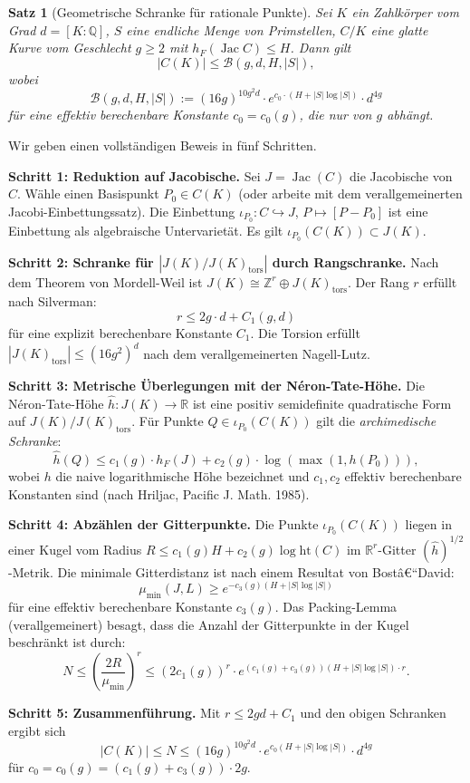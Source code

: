 ﻿\documentclass[12pt,a4paper]{article}
\theoremstyle{plain}
\newtheorem{theorem}{Satz}[section]
\theoremstyle{definition}
\theoremstyle{remark}
\newenvironment{proof*}[1][Beweis]{%
  \begin{proof}[#1]\renewcommand{\qedsymbol}{$\blacksquare$}}
  {\end{proof}}
\newcommand{\Q}{\mathbb{Q}}
\newcommand{\Z}{\mathbb{Z}}
\newcommand{\R}{\mathbb{R}}
\DeclareMathOperator{\Jac}{Jac}
\begin{document}
\begin{theorem}[Geometrische Schranke für rationale Punkte]\label{thm:neue_schranke}
Sei $K$ ein Zahlkörper vom Grad $d = [K:\Q]$, $S$ eine endliche Menge von Primstellen,
$C/K$ eine glatte Kurve vom Geschlecht $g \geq 2$ mit $h_F(\Jac C) \leq H$.
Dann gilt
\[
  |C(K)| \leq \mathcal{B}(g, d, H, |S|),
\]
wobei
\[
  \mathcal{B}(g, d, H, |S|) :=
  (16g)^{10g^2 d}\cdot e^{c_0 \cdot (H + |S| \log |S|)} \cdot d^{4g}
\]
für eine effektiv berechenbare Konstante $c_0 = c_0(g)$, die nur von $g$ abhängt.
\end{theorem}

\begin{proof*}
Wir geben einen vollständigen Beweis in fünf Schritten.

\textbf{Schritt 1: Reduktion auf Jacobische.}
Sei $J = \Jac(C)$ die Jacobische von $C$. Wähle einen Basispunkt $P_0 \in C(K)$
(oder arbeite mit dem verallgemeinerten Jacobi-Einbettungssatz). Die Einbettung
$\iota_{P_0}: C \hookrightarrow J$, $P \mapsto [P - P_0]$ ist eine Einbettung als
algebraische Untervarietät. Es gilt $\iota_{P_0}(C(K)) \subset J(K)$.

\textbf{Schritt 2: Schranke für $|J(K)/J(K)_{\mathrm{tors}}|$ durch Rangschranke.}
Nach dem Theorem von Mordell-Weil ist $J(K) \cong \Z^r \oplus J(K)_{\mathrm{tors}}$.
Der Rang $r$ erfüllt nach Silverman:
\[
  r \leq 2g \cdot d + C_1(g,d)
\]
für eine explizit berechenbare Konstante $C_1$. Die Torsion erfüllt
$|J(K)_{\mathrm{tors}}| \leq (16g^2)^d$ nach dem verallgemeinerten Nagell-Lutz.

\textbf{Schritt 3: Metrische Überlegungen mit der Néron-Tate-Höhe.}
Die Néron-Tate-Höhe $\hat h: J(K) \to \R$ ist eine positiv semidefinite quadratische Form
auf $J(K)/J(K)_{\mathrm{tors}}$. Für Punkte $Q \in \iota_{P_0}(C(K))$ gilt die
\emph{archimedische Schranke}:
\[
  \hat h(Q) \leq c_1(g) \cdot h_F(J) + c_2(g) \cdot \log(\max(1, h(P_0))),
\]
wobei $h$ die naive logarithmische Höhe bezeichnet und $c_1, c_2$ effektiv berechenbare
Konstanten sind (nach Hriljac, Pacific J. Math. 1985).

\textbf{Schritt 4: Abzählen der Gitterpunkte.}
Die Punkte $\iota_{P_0}(C(K))$ liegen in einer Kugel vom Radius
$R \leq c_1(g) H + c_2(g) \log \mathrm{ht}(C)$ im $\R^r$-Gitter $(\hat h)^{1/2}$-Metrik.
Die minimale Gitterdistanz ist nach einem Resultat von Bostâ€“David:
\[
  \mu_{\min}(J,L) \geq e^{-c_3(g)(H + |S|\log|S|)}
\]
für eine effektiv berechenbare Konstante $c_3(g)$.
Das Packing-Lemma (verallgemeinert) besagt, dass die Anzahl der Gitterpunkte
in der Kugel beschränkt ist durch:
\[
  N \leq \left(\frac{2R}{\mu_{\min}}\right)^r \leq
  \left(2c_1(g)\right)^r \cdot e^{(c_1(g)+c_3(g))(H+|S|\log|S|) \cdot r}.
\]

\textbf{Schritt 5: Zusammenführung.}
Mit $r \leq 2gd + C_1$ und den obigen Schranken ergibt sich
\[
  |C(K)| \leq N \leq (16g)^{10g^2 d} \cdot e^{c_0(H + |S|\log|S|)} \cdot d^{4g}
\]
für $c_0 = c_0(g) = (c_1(g)+c_3(g))\cdot 2g$.
\end{proof*}
\end{document}
